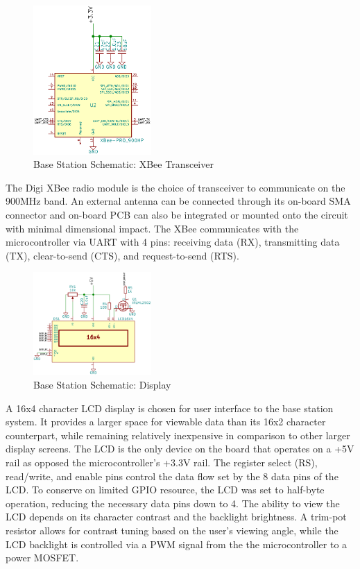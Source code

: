 \documentclass[journal,compsoc]{IEEEtran}
\begin{document}
\begin{figure}[ht] 	%
\centering
\includegraphics[width=0.4\textwidth]{base-schematic-xbee.png}
\caption{ \space Base Station Schematic: XBee Transceiver}
\label{base-sch-xbee}
\end{figure}

The Digi XBee radio module is the choice of transceiver to communicate on the 900MHz band. An external antenna can be connected through its on-board SMA connector and on-board PCB can also be integrated or mounted onto the circuit with minimal dimensional impact. The XBee communicates with the microcontroller via UART with 4 pins: receiving data (RX), transmitting data (TX), clear-to-send (CTS), and request-to-send (RTS).

\begin{figure}[ht] 	%
\centering
\includegraphics[width=0.4\textwidth]{base-schematic-lcd.png}
\caption{ \space Base Station Schematic: Display}
\label{base-sch-lcd}
\end{figure}

A 16x4 character LCD display is chosen for user interface to the base station system. It provides a larger space for viewable data than its 16x2 character counterpart, while remaining relatively inexpensive in comparison to other larger display screens. The LCD is the only device on the board that operates on a +5V rail as opposed the microcontroller's +3.3V rail. The register select (RS), read/write, and enable pins control the data flow set by the 8 data pins of the LCD. To conserve on limited GPIO resource, the LCD was set to half-byte operation, reducing the necessary data pins down to 4. The ability to view the LCD depends on its character contrast and the backlight brightness. A trim-pot resistor allows for contrast tuning based on the user's viewing angle, while the LCD backlight is controlled via a PWM signal from the the microcontroller to a power MOSFET.
\end{document}
